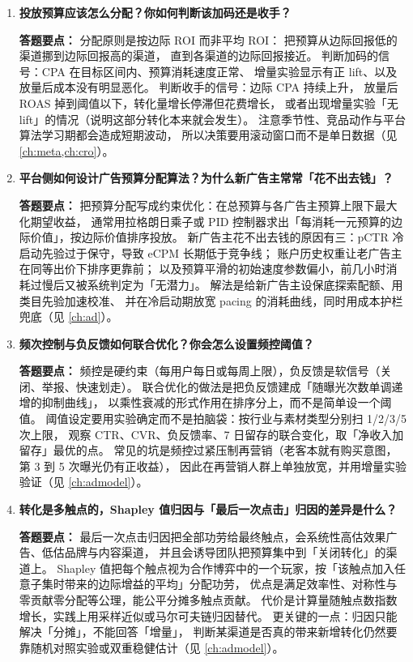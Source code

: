 \begin{interview}[题库与答题要点]
\begin{enumerate}[label=]
  \item[\textcolor{VioletDeep}{\textbf{Q75.}}] \textbf{投放预算应该怎么分配？你如何判断该加码还是收手？}
\par\smallskip\noindent\textcolor{VioletDeep}{\textbf{答题要点：}}
分配原则是按边际 ROI 而非平均 ROI：
把预算从边际回报低的渠道挪到边际回报高的渠道，
直到各渠道的边际回报接近。
判断加码的信号：CPA 在目标区间内、预算消耗速度正常、
增量实验显示有正 lift、以及放量后成本没有明显恶化。
判断收手的信号：边际 CPA 持续上升，
放量后 ROAS 掉到阈值以下，转化量增长停滞但花费增长，
或者出现增量实验「无 lift」的情况（说明这部分转化本来就会发生）。
注意季节性、竞品动作与平台算法学习期都会造成短期波动，
所以决策要用滚动窗口而不是单日数据（见 \cref{ch:meta,ch:cro}）。

  \item[\textcolor{VioletDeep}{\textbf{Q76.}}] \textbf{平台侧如何设计广告预算分配算法？为什么新广告主常常「花不出去钱」？}
\par\smallskip\noindent\textcolor{VioletDeep}{\textbf{答题要点：}}
把预算分配写成约束优化：在总预算与各广告主预算上限下最大化期望收益，
通常用拉格朗日乘子或 PID 控制器求出「每消耗一元预算的边际价值」，按边际价值排序投放。
新广告主花不出去钱的原因有三：pCTR 冷启动先验过于保守，导致 eCPM 长期低于竞争线；
账户历史权重让老广告主在同等出价下排序更靠前；
以及预算平滑的初始速度参数偏小，前几小时消耗过慢后又被系统判定为「无潜力」。
解法是给新广告主设保底探索配额、用类目先验加速校准、
并在冷启动期放宽 pacing 的消耗曲线，同时用成本护栏兜底（见 \cref{ch:ad}）。
  \item[\textcolor{VioletDeep}{\textbf{Q77.}}] \textbf{频次控制与负反馈如何联合优化？你会怎么设置频控阈值？}
\par\smallskip\noindent\textcolor{VioletDeep}{\textbf{答题要点：}}
频控是硬约束（每用户每日或每周上限），负反馈是软信号（关闭、举报、快速划走）。
联合优化的做法是把负反馈建成「随曝光次数单调递增的抑制曲线」，
以乘性衰减的形式作用在排序分上，而不是简单设一个阈值。
阈值设定要用实验确定而不是拍脑袋：按行业与素材类型分别扫 1/2/3/5 次上限，
观察 CTR、CVR、负反馈率、7 日留存的联合变化，取「净收入加留存」最优的点。
常见的坑是频控过紧压制再营销（老客本就有购买意图，第 3 到 5 次曝光仍有正收益），
因此在再营销人群上单独放宽，并用增量实验验证（见 \cref{ch:admodel}）。
  \item[\textcolor{VioletDeep}{\textbf{Q78.}}] \textbf{转化是多触点的，Shapley 值归因与「最后一次点击」归因的差异是什么？}
\par\smallskip\noindent\textcolor{VioletDeep}{\textbf{答题要点：}}
最后一次点击归因把全部功劳给最终触点，会系统性高估效果广告、低估品牌与内容渠道，
并且会诱导团队把预算集中到「关闭转化」的渠道上。
Shapley 值把每个触点视为合作博弈中的一个玩家，按「该触点加入任意子集时带来的边际增益的平均」分配功劳，
优点是满足效率性、对称性与零贡献零分配等公理，能公平分摊多触点贡献。
代价是计算量随触点数指数增长，实践上用采样近似或马尔可夫链归因替代。
更关键的一点：归因只能解决「分摊」，不能回答「增量」，
判断某渠道是否真的带来新增转化仍然要靠随机对照实验或双重稳健估计（见 \cref{ch:admodel}）。

\end{enumerate}

\end{interview}

